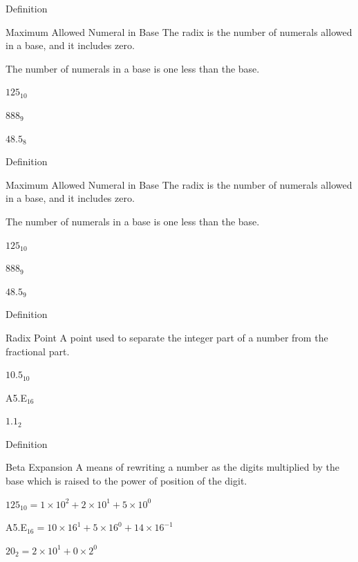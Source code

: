 \documentclass{beamer}
\begin{document}
\begin{frame}{Definition}
  \begin{block}{Maximum Allowed Numeral in Base}
    The radix is the number of numerals allowed in a base, and it includes zero. \pause

    The number of numerals in a base is one less than the base.
  \end{block}\pause

  \begin{example}\pause
    $125_{10}$ \pause

    $888_9$ \pause

    $48.5_8$
  \end{example}
\end{frame}
\begin{frame}{Definition}
  \addtocounter{framenumber}{-1}
  \begin{block}{Maximum Allowed Numeral in Base}
    The radix is the number of numerals allowed in a base, and it includes zero.

    The number of numerals in a base is one less than the base.
  \end{block}

  \begin{example}
    $125_{10}$

    $888_9$

    $48.5_9$
  \end{example}
\end{frame}

\begin{frame}{Definition}
  \begin{block}{Radix Point}
    A point used to separate the integer part of a number from the fractional part.
  \end{block}\pause

  \begin{example}\pause
      $10.5_{10}$ \pause

      A5.E$_{16}$ \pause

      $1.1_2$
  \end{example}
\end{frame}

\begin{frame}{Definition}
  \begin{block}{Beta Expansion}
    A means of rewriting a number as the digits multiplied by the base which is raised to the power of position of the digit.
  \end{block}\pause

  \begin{example}\pause
    $125_{10} = 1\times10^2 + 2\times10^1 + 5\times10^0$ \pause

    A5.E$_{16} = 10\times16^1 + 5\times16^0 + 14\times16^{-1}$ \pause

    $20_2 = 2\times10^1+0\times2^0$
  \end{example}
\end{frame}
\end{document}
